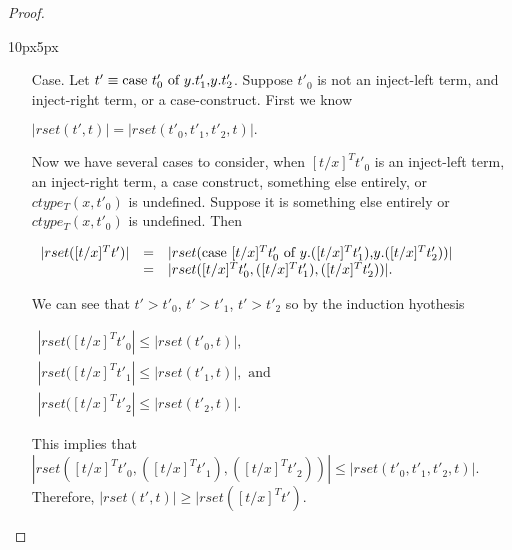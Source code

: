 \begin{proof}
\begin{changemargin}{10px}{5px}
\begin{itemize}
\item[Case.] 
  Let $t' \equiv \mbox{case}\ t'_0\ \text{of}\ y\text{.}t'_1\text{,}y\text{.}t'_2$.  Suppose $t'_0$ is not an inject-left term, and inject-right term,
  or a case-construct.  First we know 
  \begin{center}
    \begin{math}
      |rset(t', t)| = |rset(t'_0, t'_1, t'_2, t)|.
    \end{math}
  \end{center}
  Now we have several cases to consider, when $[t/x]^T t'_0$ is an inject-left term,
  an inject-right term, a case construct, something else entirely, or $ctype_T(x,t'_0)$ is undefined. Suppose it is something else entirely or
  $ctype_T(x,t'_0)$ is undefined.
  Then 
  \begin{center}
    \begin{math}
      \begin{array}{lll}
        |rset([t/x]^T t')| & = & |rset(\mbox{case}\ [t/x]^T t'_0\ \text{of}\ y\text{.}([t/x]^T t'_1)\text{,}y\text{.}([t/x]^T t'_2))|\\
        & = & |rset([t/x]^T t'_0,([t/x]^T t'_1),([t/x]^T t'_2))|.
      \end{array}
    \end{math}
  \end{center}
  We can see that $t' > t'_0$, $t' > t'_1$, $t' > t'_2$ so by the induction hyothesis
  \begin{center}
    \begin{math}
      \begin{array}{lll}
        |rset([t/x]^T t'_0| \leq |rset(t'_0, t)|,\\
        |rset([t/x]^T t'_1| \leq |rset(t'_1, t)|, \text{ and }\\
        |rset([t/x]^T t'_2| \leq |rset(t'_2, t)|.
      \end{array}
    \end{math}
  \end{center}
  This implies that $|rset([t/x]^T t'_0,([t/x]^T t'_1),([t/x]^T t'_2))| \leq |rset(t'_0,t'_1,t'_2,t)|$.\\
  Therefore, $|rset(t', t)| \geq |rset([t/x]^T t')$.
  

\end{itemize}
\end{changemargin}
\end{proof}
